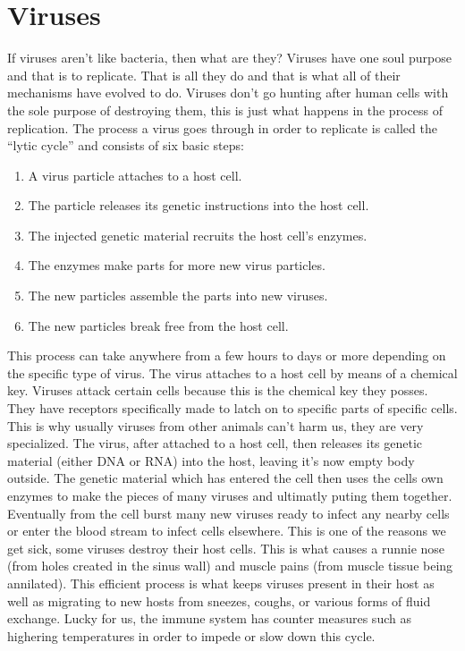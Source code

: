 \documentclass[12pt ]{report}
\begin{document}
\section*{Viruses}
If viruses aren't like bacteria, then what are they?  Viruses have one soul purpose and that is to replicate.  That is all they do and that is what all of their mechanisms have evolved to do.  Viruses don't go hunting after human cells with the sole purpose of destroying them, this is just what happens in the process of replication.  The process a virus goes through in order to replicate is called the "`lytic cycle"' and consists of six basic steps:
\begin{enumerate}
	\item A virus particle attaches to a host cell.
	\item The particle releases its genetic instructions into the host cell. 
	\item The injected genetic material recruits the host cell's enzymes.
	\item The enzymes make parts for more new virus particles.
	\item The new particles assemble the parts into new viruses.
	\item The new particles break free from the host cell. 
\end{enumerate}
\noindent This process can take anywhere from a few hours to days or more depending on the specific type of virus.  The virus attaches to a host cell by means of a chemical key.  Viruses attack certain cells because this is the chemical key they posses.  They have receptors specifically made to latch on to specific parts of specific cells.  This is why usually viruses from other animals can't harm us, they are very specialized.  The virus, after attached to a host cell, then releases its genetic material (either DNA or RNA) into the host, leaving it's now empty body outside.  The genetic material which has entered the cell then uses the cells own enzymes to make the pieces of many viruses and ultimatly puting them together.  Eventually from the cell burst many new viruses ready to infect any nearby cells or enter the blood stream to infect cells elsewhere.  This is one of the reasons we get sick, some viruses destroy their host cells.  This is what causes a runnie nose (from holes created in the sinus wall) and muscle pains (from muscle tissue being annilated).  This efficient process is what keeps viruses present in their host as well as migrating to new hosts from sneezes, coughs, or various forms of fluid exchange.  Lucky for us, the immune system has counter measures such as highering temperatures in order to impede or slow down this cycle.
\end{document}
